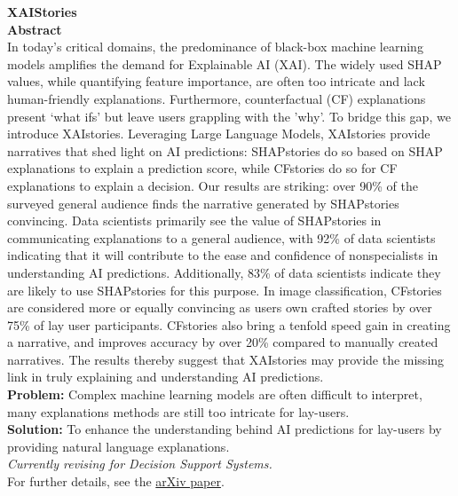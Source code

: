 \textbf{XAIStories}\\
\textbf{Abstract} \\
In today's critical domains, the predominance of black-box machine learning models amplifies the demand for 
Explainable AI (XAI). The widely used SHAP values, while quantifying feature importance, are often too 
intricate and lack human-friendly explanations. Furthermore, counterfactual (CF) explanations present 
`what ifs' but leave users grappling with the 'why'. To bridge this gap, we introduce XAIstories. 
Leveraging Large Language Models, XAIstories provide narratives that shed light on AI predictions: 
SHAPstories do so based on SHAP explanations to explain a prediction score, while CFstories do so for CF 
explanations to explain a decision. Our results are striking: over 90\% of the surveyed general audience 
finds the narrative generated by SHAPstories convincing. Data scientists primarily see the value of SHAPstories 
in communicating explanations to a general audience, with 92\% of data scientists indicating that it will contribute 
to the ease and confidence of nonspecialists in understanding AI predictions. Additionally, 83\% of data 
scientists indicate they are likely to use SHAPstories for this purpose. In image classification, 
CFstories are considered more or equally convincing as users own crafted stories by over 75\% of lay 
user participants. CFstories also bring a tenfold speed gain in creating a narrative, and improves accuracy by 
over 20\% compared to manually created narratives. The results thereby suggest that XAIstories may provide the 
missing link in truly explaining and understanding AI predictions.\\
\textbf{Problem:} Complex machine learning models are often difficult to interpret, many explanations methods are still
too intricate for lay-users.\\
\textbf{Solution:} To enhance the understanding behind AI predictions for lay-users by providing natural language
explanations.\\
\textit{Currently revising for Decision Support Systems.} \\
For further details, see the \href{https://arxiv.org/abs/2309.17057}{arXiv paper}. \\


